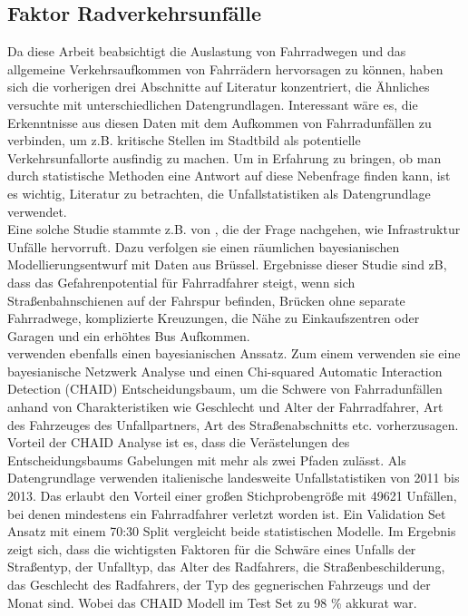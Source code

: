 \documentclass[a4paper,12pt]{thesis}
\begin{document}
\subsection{Faktor Radverkehrsunfälle}

Da diese Arbeit beabsichtigt die Auslastung von Fahrradwegen und das allgemeine Verkehrsaufkommen von Fahrrädern hervorsagen zu können, haben sich die vorherigen drei Abschnitte auf Literatur konzentriert, die Ähnliches versuchte mit unterschiedlichen Datengrundlagen. Interessant wäre es, die Erkenntnisse aus diesen Daten mit dem Aufkommen von Fahrradunfällen zu verbinden, um z.B. kritische Stellen im Stadtbild als potentielle Verkehrsunfallorte ausfindig zu machen. Um in Erfahrung zu bringen, ob man durch statistische Methoden eine Antwort auf diese Nebenfrage finden kann, ist es wichtig, Literatur zu betrachten, die Unfallstatistiken als Datengrundlage verwendet.\\
Eine solche Studie stammte z.B. von \cite{Vandenbulcke2014}, die der Frage nachgehen, wie Infrastruktur Unfälle hervorruft. Dazu verfolgen sie einen räumlichen bayesianischen Modellierungsentwurf mit Daten aus Brüssel. Ergebnisse dieser Studie sind zB, dass das Gefahrenpotential für Fahrradfahrer steigt, wenn sich Straßenbahnschienen auf der Fahrspur befinden, Brücken ohne separate Fahrradwege, komplizierte Kreuzungen, die Nähe zu Einkaufszentren oder Garagen und ein erhöhtes Bus Aufkommen.\\
\cite{PRATI201744} verwenden ebenfalls einen bayesianischen Anssatz. Zum einem verwenden sie eine bayesianische Netzwerk Analyse und einen Chi-squared Automatic Interaction Detection (CHAID) Entscheidungsbaum, um die Schwere von Fahrradunfällen anhand von Charakteristiken wie Geschlecht und Alter der Fahrradfahrer, Art des Fahrzeuges des Unfallpartners, Art des Straßenabschnitts etc. vorherzusagen. Vorteil der CHAID Analyse ist es, dass die Verästelungen des Entscheidungsbaums Gabelungen mit mehr als zwei Pfaden zulässt. Als Datengrundlage verwenden \cite{PRATI201744} italienische landesweite Unfallstatistiken von 2011 bis 2013. Das erlaubt den Vorteil einer großen Stichprobengröße mit 49621 Unfällen, bei denen mindestens ein Fahrradfahrer verletzt worden ist. Ein Validation Set Ansatz mit einem 70:30 Split vergleicht beide statistischen Modelle. Im Ergebnis zeigt sich, dass die wichtigsten Faktoren für die Schwäre eines Unfalls der Straßentyp, der Unfalltyp, das Alter des Radfahrers, die Straßenbeschilderung, das Geschlecht des Radfahrers, der Typ des gegnerischen Fahrzeugs und der Monat sind. Wobei das CHAID Modell im Test Set zu 98 \% akkurat war.\\
\end{document}
